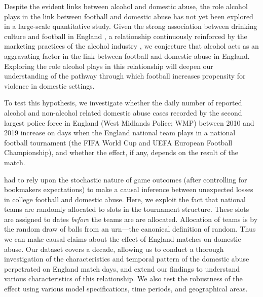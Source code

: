 \documentclass[12pt, a4paper]{article}
\begin{document}


Despite the evident links between alcohol and domestic abuse, the role alcohol plays in the link between football and domestic abuse has not yet been explored in a large-scale quantitative study. Given the strong association between drinking culture and football in England \cite{Dixon2014}, a relationship continuously reinforced by the marketing practices of the alcohol industry \cite{Gornall2014}, we conjecture that alcohol acts as an aggravating factor in the link between football and domestic abuse in England. Exploring the role alcohol plays in this relationship will deepen our understanding of the pathway through which football increases propensity for violence in domestic settings.

To test this hypothesis, we investigate whether the daily number of reported alcohol and non-alcohol related domestic abuse cases recorded by the second largest police force in England (West Midlands Police; WMP) between 2010 and 2019 increase on days when the England national team plays in a national football tournament (the FIFA World Cup and UEFA European Football Championship), and whether the effect, if any, depends on the result of the match.

 had to rely upon the stochastic nature of game outcomes (after controlling for bookmakers expectations) to make a causal inference between unexpected losses in college football and domestic abuse. 
Here, we exploit the fact that national teams are randomly allocated to slots in the tournament structure.
These slots are assigned to dates \emph{before} the teams are are allocated.
Allocation of teams is by the random draw of balls from an urn---the canonical definition of random. 
Thus we can make causal claims about the effect of England matches on domestic abuse.
Our dataset covers a decade, allowing us to conduct a thorough investigation of the characteristics and temporal pattern of the domestic abuse perpetrated on England match days, and extend our findings to understand various characteristics of this relationship. 
We also test the robustness of the effect using various model specifications, time periods, and geographical areas. 
\end{document}
